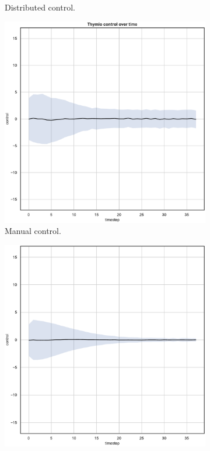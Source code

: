 \begin{figure}[!htb]
\begin{center}
\begin{subfigure}[h]{0.35\textwidth}
			\caption{Distributed control.}
		\end{subfigure}
	\end{center}
	\begin{center}
		\begin{subfigure}[h]{0.35\textwidth}			
			\includegraphics[width=\textwidth]{contents/images/net-d12/control-overtime-manual}%
			\caption{Manual control.}
		\end{subfigure}
		\hspace{1cm}
		\begin{subfigure}[h]{0.35\textwidth}
			\includegraphics[width=\textwidth]{contents/images/net-c12/control-overtime-learned_communication}

\end{subfigure}
\end{center}
\end{figure}
